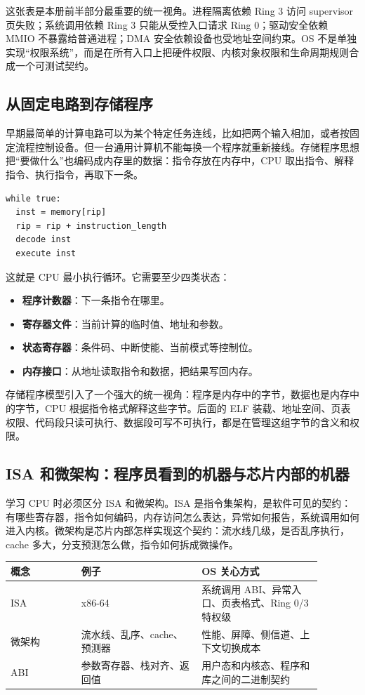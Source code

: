 这张表是本册前半部分最重要的统一视角。进程隔离依赖 Ring 3 访问 supervisor 页失败；系统调用依赖 Ring 3 只能从受控入口请求 Ring 0；驱动安全依赖 MMIO 不暴露给普通进程；DMA 安全依赖设备也受地址空间约束。OS 不是单独实现“权限系统”，而是在所有入口上把硬件权限、内核对象权限和生命周期规则合成一个可测试契约。

\subsection{从固定电路到存储程序}

早期最简单的计算电路可以为某个特定任务连线，比如把两个输入相加，或者按固定流程控制设备。但一台通用计算机不能每换一个程序就重新接线。存储程序思想把“要做什么”也编码成内存里的数据：指令存放在内存中，CPU 取出指令、解释指令、执行指令，再取下一条。

\begin{lstlisting}
while true:
  inst = memory[rip]
  rip = rip + instruction_length
  decode inst
  execute inst
\end{lstlisting}

这就是 CPU 最小执行循环。它需要至少四类状态：

\begin{itemize}
\tightlist
\item \textbf{程序计数器}：下一条指令在哪里。
\item \textbf{寄存器文件}：当前计算的临时值、地址和参数。
\item \textbf{状态寄存器}：条件码、中断使能、当前模式等控制位。
\item \textbf{内存接口}：从地址读取指令和数据，把结果写回内存。
\end{itemize}

存储程序模型引入了一个强大的统一视角：程序是内存中的字节，数据也是内存中的字节，CPU 根据指令格式解释这些字节。后面的 ELF 装载、地址空间、页表权限、代码段只读可执行、数据段可写不可执行，都是在管理这组字节的含义和权限。

\subsection{ISA 和微架构：程序员看到的机器与芯片内部的机器}

学习 CPU 时必须区分 ISA 和微架构。ISA 是指令集架构，是软件可见的契约：有哪些寄存器，指令如何编码，内存访问怎么表达，异常如何报告，系统调用如何进入内核。微架构是芯片内部怎样实现这个契约：流水线几级，是否乱序执行，cache 多大，分支预测怎么做，指令如何拆成微操作。

\begin{longtable}{p{0.2\linewidth}p{0.34\linewidth}p{0.34\linewidth}}
\toprule
概念 & 例子 & OS 关心方式 \\
\midrule
ISA & x86-64 & 系统调用 ABI、异常入口、页表格式、Ring 0/3 特权级 \\
微架构 & 流水线、乱序、cache、预测器 & 性能、屏障、侧信道、上下文切换成本 \\
ABI & 参数寄存器、栈对齐、返回值 & 用户态和内核态、程序和库之间的二进制契约 \\
\bottomrule
\end{longtable}

